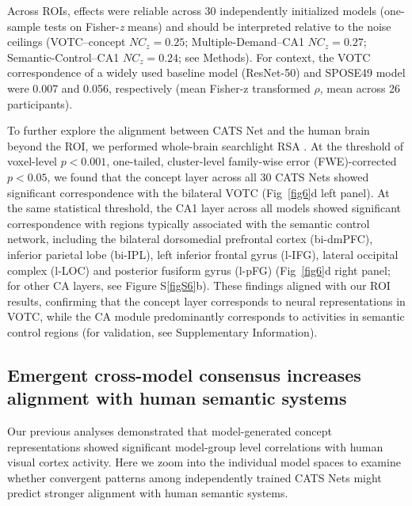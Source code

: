 \documentclass[pdflatex,sn-mathphys-num,lineno]{sn-jnl}%
\begin{document}
\begin{CJK}{UTF8}{gbsn}
Across ROIs, effects were reliable across 30 independently initialized models (one-sample tests on Fisher-\textit{z} means) and should be interpreted relative to the noise ceilings (VOTC–concept $NC_z = 0.25$; Multiple-Demand–CA1 $NC_z = 0.27$; Semantic-Control–CA1 $NC_z = 0.24$; see Methods). For context, the VOTC correspondence of a widely used baseline model (ResNet-50) and SPOSE49 model were 0.007 and 0.056, respectively (mean Fisher-z transformed $\rho$, mean across 26 participants). 

To further explore the alignment between CATS Net and the human brain beyond the ROI, we performed whole-brain searchlight RSA \cite{kriegeskorte_information-based_2006}. At the threshold of voxel-level $p < 0.001$, one-tailed, cluster-level family-wise error (FWE)-corrected $p < 0.05$, we found that the concept layer across all 30 CATS Nets showed significant correspondence with the bilateral VOTC (Fig~\ref{fig6}d left panel). At the same statistical threshold, the CA1 layer across all models showed significant correspondence with regions typically associated with the semantic control network, including the bilateral dorsomedial prefrontal cortex (bi-dmPFC), inferior parietal lobe (bi-IPL), left inferior frontal gyrus (l-IFG), lateral occipital complex (l-LOC) and posterior fusiform gyrus (l-pFG) (Fig~\ref{fig6}d right panel; for other CA layers, see Figure S\ref{figS6}b). These findings aligned with our ROI results, confirming that the concept layer corresponds to neural representations in VOTC, while the CA module predominantly corresponds to activities in semantic control regions (for validation, see Supplementary Information).

\subsection{Emergent cross-model consensus increases alignment with human semantic systems}
Our previous analyses demonstrated that model-generated concept representations showed significant model-group level correlations with human visual cortex activity. Here we zoom into the individual model spaces to examine whether convergent patterns among independently trained CATS Nets might predict stronger alignment with human semantic systems.


\end{CJK}
\end{document}

